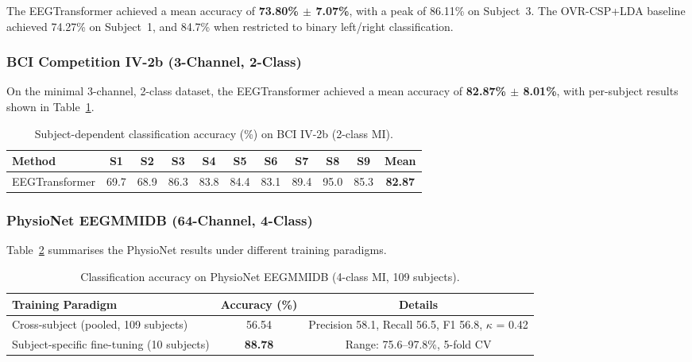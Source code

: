 \documentclass[12pt, a4paper]{article}
\begin{document}
The EEGTransformer achieved a mean accuracy of \textbf{73.80\% $\pm$ 7.07\%}, with a peak of 86.11\% on Subject~3. The OVR-CSP+LDA baseline achieved 74.27\% on Subject~1, and 84.7\% when restricted to binary left/right classification.

\subsubsection{BCI Competition IV-2b (3-Channel, 2-Class)}

On the minimal 3-channel, 2-class dataset, the EEGTransformer achieved a mean accuracy of \textbf{82.87\% $\pm$ 8.01\%}, with per-subject results shown in Table~\ref{tab:iv2b_results}.

\begin{table}[htbp]
\centering
\caption{Subject-dependent classification accuracy (\%) on BCI IV-2b (2-class MI).}
\label{tab:iv2b_results}
\begin{tabular}{lcccccccccc}
\toprule
\textbf{Method} & \textbf{S1} & \textbf{S2} & \textbf{S3} & \textbf{S4} & \textbf{S5} & \textbf{S6} & \textbf{S7} & \textbf{S8} & \textbf{S9} & \textbf{Mean} \\
\midrule
EEGTransformer & 69.7 & 68.9 & 86.3 & 83.8 & 84.4 & 83.1 & 89.4 & 95.0 & 85.3 & \textbf{82.87} \\
\bottomrule
\end{tabular}
\end{table}

\subsubsection{PhysioNet EEGMMIDB (64-Channel, 4-Class)}

Table~\ref{tab:physionet_results} summarises the PhysioNet results under different training paradigms.

\begin{table}[htbp]
\centering
\caption{Classification accuracy on PhysioNet EEGMMIDB (4-class MI, 109 subjects).}
\label{tab:physionet_results}
\begin{tabular}{lcc}
\toprule
\textbf{Training Paradigm} & \textbf{Accuracy (\%)} & \textbf{Details} \\
\midrule
Cross-subject (pooled, 109 subjects) & 56.54 & Precision 58.1, Recall 56.5, F1 56.8, $\kappa$ = 0.42 \\
Subject-specific fine-tuning (10 subjects) & \textbf{88.78} & Range: 75.6--97.8\%, 5-fold CV \\
\bottomrule
\end{tabular}
\end{table}
\end{document}
